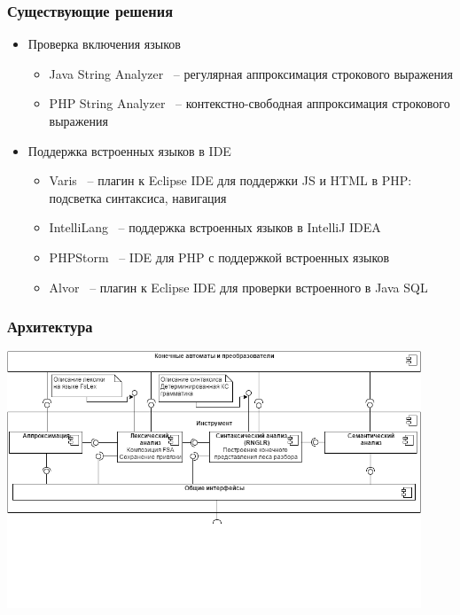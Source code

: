 \documentclass{beamer}
\begin{document}
\begin{frame}[fragile]
	\transwipe[direction=90]
	\frametitle{Существующие решения}
	\begin{itemize}
		\item Проверка включения языков
			\begin{itemize}
				\item Java String Analyzer ~-- регулярная аппроксимация строкового выражения
				\item PHP String Analyzer ~-- контекстно-свободная аппроксимация строкового выражения
			\end{itemize}
		\item Поддержка встроенных языков в IDE
			\begin{itemize}
				\item Varis ~-- плагин к Eclipse IDE для поддержки JS и HTML в PHP: подсветка синтаксиса, навигация
				\item IntelliLang ~-- поддержка встроенных языков в IntelliJ IDEA
				\item PHPStorm ~-- IDE для PHP с поддержкой встроенных языков
				\item Alvor ~-- плагин к Eclipse IDE для проверки встроенного в Java SQL
			\end{itemize}
	    \end{itemize}
\end{frame}

\begin{frame}[fragile]
	\transwipe[direction=90]
	\frametitle{Архитектура}
	\begin{center}
		\includegraphics[width=350pt]{pictures/SELYCcomponents.jpg}
	\end{center}
\end{frame}
\end{document}
